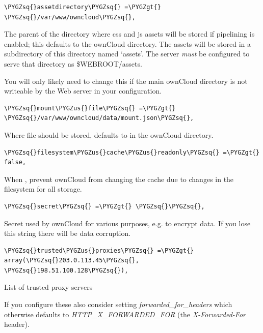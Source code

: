 \documentclass[letterpaper,10pt,english]{sphinxmanual}
\def\PYGZus{\char`\_}
\def\PYGZgt{\char`\>}
\def\PYGZsq{\char`\'}
\begin{document}
\begin{Verbatim}[commandchars=\\\{\}]
\PYGZsq{}assetdirectory\PYGZsq{} =\PYGZgt{} \PYGZsq{}/var/www/owncloud\PYGZsq{},
\end{Verbatim}

The parent of the directory where css and js assets will be stored if
pipelining is enabled; this defaults to the ownCloud directory. The assets
will be stored in a subdirectory of this directory named `assets'. The
server \emph{must} be configured to serve that directory as \$WEBROOT/assets.

You will only likely need to change this if the main ownCloud directory
is not writeable by the Web server in your configuration.

\begin{Verbatim}[commandchars=\\\{\}]
\PYGZsq{}mount\PYGZus{}file\PYGZsq{} =\PYGZgt{} \PYGZsq{}/var/www/owncloud/data/mount.json\PYGZsq{},
\end{Verbatim}

Where  file should be stored, defaults to 
in the ownCloud directory.

\begin{Verbatim}[commandchars=\\\{\}]
\PYGZsq{}filesystem\PYGZus{}cache\PYGZus{}readonly\PYGZsq{} =\PYGZgt{} false,
\end{Verbatim}

When , prevent ownCloud from changing the cache due to changes in the
filesystem for all storage.

\begin{Verbatim}[commandchars=\\\{\}]
\PYGZsq{}secret\PYGZsq{} =\PYGZgt{} \PYGZsq{}\PYGZsq{},
\end{Verbatim}

Secret used by ownCloud for various purposes, e.g. to encrypt data. If you
lose this string there will be data corruption.

\begin{Verbatim}[commandchars=\\\{\}]
\PYGZsq{}trusted\PYGZus{}proxies\PYGZsq{} =\PYGZgt{} array(\PYGZsq{}203.0.113.45\PYGZsq{}, \PYGZsq{}198.51.100.128\PYGZsq{}),
\end{Verbatim}

List of trusted proxy servers

If you configure these also consider setting \emph{forwarded\_for\_headers} which
otherwise defaults to \emph{HTTP\_X\_FORWARDED\_FOR} (the \emph{X-Forwarded-For} header).
\end{document}
